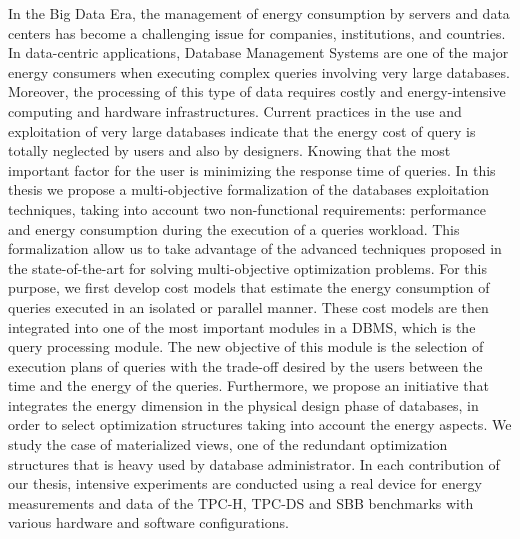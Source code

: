 \begin{ThesisAbstract}
\begin{FrenchAbstract}

\end{FrenchAbstract}
\clearpage

\begin{EnglishAbstract}

In the Big Data Era, the management of energy consumption by servers and data centers has become a challenging issue for companies, institutions, and countries. In data-centric applications, Database Management Systems are one of the major energy consumers when executing complex queries involving very large databases.
Moreover, the processing of this type of data requires costly and energy-intensive computing and hardware infrastructures. Current practices in the use and exploitation of very large databases indicate that the energy cost of query is totally neglected by users and also by designers. Knowing that the most important factor for the user is minimizing the response time of queries. In this thesis we propose a multi-objective formalization of the databases exploitation techniques, taking into account two non-functional requirements: performance and energy consumption during the execution of a queries workload. This formalization allow us to take advantage of the advanced techniques proposed in the state-of-the-art for solving multi-objective optimization problems. For this purpose, we first develop cost models that estimate the energy consumption of queries executed in an isolated or parallel manner. These cost models are then integrated into one of the most important modules in a DBMS, which is the query processing module. The new objective of this module is the selection of execution plans of queries with the trade-off desired by the users between the time and the energy of the queries. Furthermore, we propose an initiative that integrates the energy dimension in the physical design phase of databases, in order to select optimization structures taking into account the energy aspects. We study the case of materialized views, one of the redundant optimization structures that is heavy used by database administrator. In each contribution of our thesis, intensive experiments are conducted using a real device for energy measurements and data of the TPC-H, TPC-DS and SBB benchmarks with various hardware and software configurations.


\end{EnglishAbstract}
\end{ThesisAbstract}
